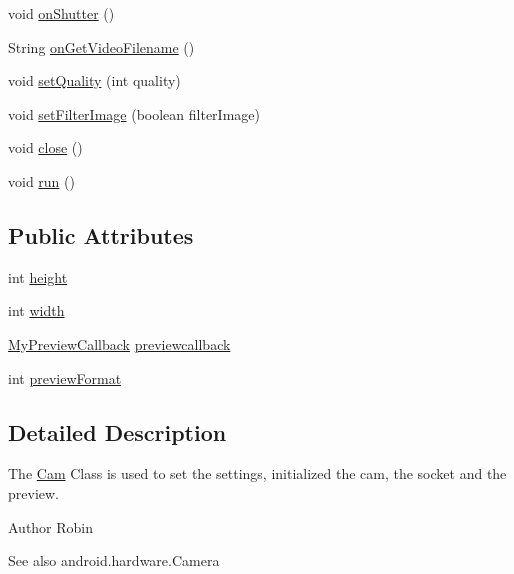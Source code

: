 \begin{DoxyCompactItemize}
\item 
void \hyperlink{classswp_1_1tuilmenau_1_1carduinodroid_1_1controller_1_1_cam_aef536a7a7774a554aff67f70c5edd1de}{on\+Shutter} ()
\item 
String \hyperlink{classswp_1_1tuilmenau_1_1carduinodroid_1_1controller_1_1_cam_a75b628ee85543bcf0a65cacdaa740430}{on\+Get\+Video\+Filename} ()
\item 
void \hyperlink{classswp_1_1tuilmenau_1_1carduinodroid_1_1controller_1_1_cam_a06e60590e27bce234a6a7f1657f18fc0}{set\+Quality} (int quality)
\item 
void \hyperlink{classswp_1_1tuilmenau_1_1carduinodroid_1_1controller_1_1_cam_a07ee3858c299fe36d607870100d002f8}{set\+Filter\+Image} (boolean filter\+Image)
\item 
void \hyperlink{classswp_1_1tuilmenau_1_1carduinodroid_1_1controller_1_1_cam_a690bbb9c9a4a7555c3e439f5b4e1399e}{close} ()
\item 
void \hyperlink{classswp_1_1tuilmenau_1_1carduinodroid_1_1controller_1_1_cam_ab8d692383962618c356c0d52327a348f}{run} ()
\end{DoxyCompactItemize}
\subsection*{Public Attributes}
\begin{DoxyCompactItemize}
\item 
int \hyperlink{classswp_1_1tuilmenau_1_1carduinodroid_1_1controller_1_1_cam_ad1ccac6361b23927ec4b0a3e0bec3136}{height}
\item 
int \hyperlink{classswp_1_1tuilmenau_1_1carduinodroid_1_1controller_1_1_cam_aceeda61bce71daa554b0c126c3da9fbd}{width}
\item 
\hyperlink{classswp_1_1tuilmenau_1_1carduinodroid_1_1controller_1_1_my_preview_callback}{My\+Preview\+Callback} \hyperlink{classswp_1_1tuilmenau_1_1carduinodroid_1_1controller_1_1_cam_a82f8480d3673cfd9ee378542f1b0e4ba}{previewcallback}
\item 
int \hyperlink{classswp_1_1tuilmenau_1_1carduinodroid_1_1controller_1_1_cam_a4d7a39cefe301ecdd373f6457ba998df}{preview\+Format}
\end{DoxyCompactItemize}


\subsection{Detailed Description}
The \hyperlink{classswp_1_1tuilmenau_1_1carduinodroid_1_1controller_1_1_cam}{Cam} Class is used to set the settings, initialized the cam, the socket and the preview. \begin{DoxyAuthor}{Author}
Robin 
\end{DoxyAuthor}
\begin{DoxySeeAlso}{See also}
android.\+hardware.\+Camera 
\end{DoxySeeAlso}


